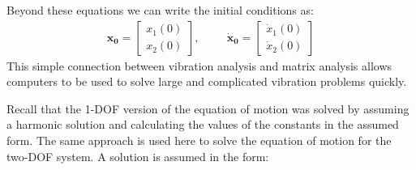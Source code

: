 \documentclass[12pt,letter]{article}
\numberwithin{ex}{section} %
\numberwithin{re}{section} %
\begin{document}
Beyond these equations we can write the initial conditions as:
\begin{eqnarray}
\mathbf{x_0}=  \begin{bmatrix} x_1(0) \\  x_2(0) \end{bmatrix},  \hspace{1cm} \mathbf{\dot{x}_0}=  \begin{bmatrix} \dot{x}_1(0) \\  \dot{x}_2(0) \end{bmatrix}
\end{eqnarray}
This simple connection between vibration analysis and matrix analysis allows computers to be used to solve large and complicated vibration problems quickly.

Recall that the 1-DOF version of the equation of motion was solved by assuming a harmonic solution and calculating the values of the constants in the assumed form. The same approach is used here to solve the equation of motion for the two-DOF system.  A solution is assumed in the form:
\end{document}
